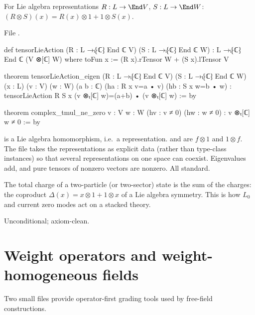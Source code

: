 \begin{definition}\label{l04:def:tenlie}
For Lie algebra representations $R:L\to\End V$, $S:L\to\End W$: $(R\otimes S)(x) = R(x)\otimes1 +
1\otimes S(x)$.
\end{definition}
\noindent File .
\begin{leancode}
def tensorLieAction (R : L →ₗ⁅ℂ⁆ End ℂ V) (S : L →ₗ⁅ℂ⁆ End ℂ W) :
    L →ₗ⁅ℂ⁆ End ℂ (V ⊗[ℂ] W) where
  toFun x := (R x).rTensor W + (S x).lTensor V

theorem tensorLieAction_eigen (R : L →ₗ⁅ℂ⁆ End ℂ V) (S : L →ₗ⁅ℂ⁆ End ℂ W)
    (x : L) (v : V) (w : W) (a b : ℂ) (ha : R x v=a • v) (hb : S x w=b • w) :
    tensorLieAction R S x (v ⊗ₜ[ℂ] w)=(a+b) • (v ⊗ₜ[ℂ] w) := by

theorem complex_tmul_ne_zero {v : V} {w : W} (hv : v ≠ 0) (hw : w ≠ 0) :
    v ⊗ₜ[ℂ] w ≠ 0 := by
\end{leancode}
\begin{dictionary}
 is a Lie algebra homomorphism, i.e.\ a representation. 
and  are $f\otimes1$ and $1\otimes f$. The file takes the representations as explicit
data (rather than type-class instances) so that several representations on one space can coexist.
Eigenvalues add, and pure tensors of nonzero vectors are nonzero. All standard.
\end{dictionary}
\begin{physics}
The total charge of a two-particle (or two-sector) state is the sum of the charges: the coproduct
$\Delta(x) = x\otimes1+1\otimes x$ of a Lie algebra symmetry. This is how $L_0$ and current zero modes act
on a stacked theory.
\end{physics}
\begin{status}
Unconditional; axiom-clean.
\end{status}

\section{Weight operators and weight-homogeneous fields}\label{l04:sec:weightop}

Two small files provide operator-first grading tools used by free-field constructions.

